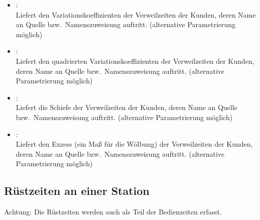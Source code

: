 \begin{itemize}
\item
{}:\\
Liefert den Variationskoeffizienten der Verweilzeiten der Kunden, deren Name an Quelle bzw.\ Namenszuweisung  auftritt.
(alternative Parametrierung möglich)

\item
{}:\\
Liefert den quadrierten Variationskoeffizienten der Verweilzeiten der Kunden, deren Name an Quelle bzw.\ Namenszuweisung  auftritt.
(alternative Parametrierung möglich)

\item
{}:\\
Liefert die Schiefe der Verweilzeiten der Kunden, deren Name an Quelle bzw.\ Namenszuweisung  auftritt.
(alternative Parametrierung möglich)

\item
{}:\\
Liefert den Exzess (ein Maß für die Wölbung) der Verweilzeiten der Kunden, deren Name an Quelle bzw.\ Namenszuweisung  auftritt.
(alternative Parametrierung möglich)

\end{itemize}  



\subsection{Rüstzeiten an einer Station}

Achtung: Die Rüstzeiten werden auch als Teil der Bedienzeiten erfasst.

